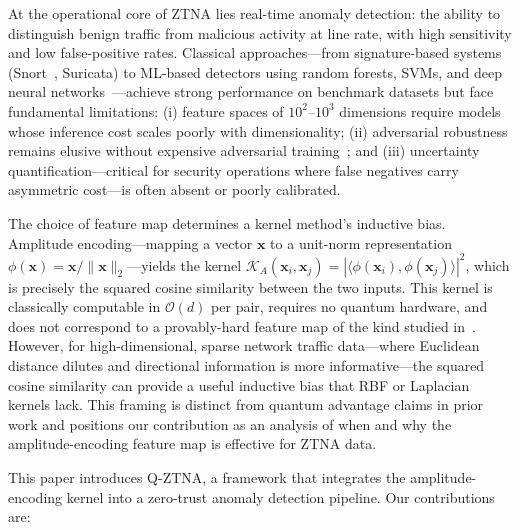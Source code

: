 \documentclass[twocolumn,a4paper,11pt]{article}
\begin{document}
At the operational core of ZTNA lies real-time anomaly detection: the ability to
distinguish benign traffic from malicious activity at line rate, with high sensitivity
and low false-positive rates. Classical approaches---from signature-based systems
(Snort~\cite{roesch1999snort}, Suricata) to ML-based detectors using random forests,
SVMs, and deep neural networks~\cite{sommer2010machine,
mirsky2018kitsune}---achieve strong performance on benchmark datasets but face
fundamental limitations: (i) feature spaces of $10^2$--$10^3$ dimensions require
models whose inference cost scales poorly with dimensionality; (ii) adversarial
robustness remains elusive without expensive adversarial training~\cite{goodfellow2014explaining};
and (iii) uncertainty quantification---critical for security operations where
false negatives carry asymmetric cost---is often absent or poorly calibrated.

The choice of feature map determines a kernel method's inductive bias. Amplitude
encoding---mapping a vector $\mathbf{x}$ to a unit-norm representation
$\phi(\mathbf{x}) = \mathbf{x} / \|\mathbf{x}\|_2$---yields the kernel
$\mathcal{K}_A(\mathbf{x}_i, \mathbf{x}_j) = |\langle\phi(\mathbf{x}_i),
\phi(\mathbf{x}_j)\rangle|^2$, which is precisely the squared cosine similarity
between the two inputs. This kernel is classically computable in $\mathcal{O}(d)$
per pair, requires no quantum hardware, and does not correspond to a
provably-hard feature map of the kind studied
in~\cite{havlicek2019supervised,huang2021power}. However, for high-dimensional,
sparse network traffic data---where Euclidean distance dilutes and directional
information is more informative---the squared cosine similarity can provide a
useful inductive bias that RBF or Laplacian kernels lack. This framing is
distinct from quantum advantage claims in prior work and positions our
contribution as an analysis of when and why the amplitude-encoding feature map
is effective for ZTNA data.

This paper introduces Q-ZTNA, a framework that integrates the amplitude-encoding
kernel into a zero-trust anomaly detection pipeline. Our contributions are:
\end{document}
